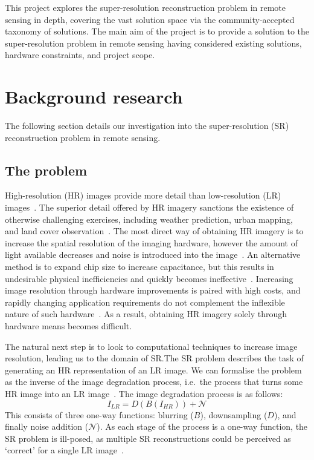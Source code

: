 This project explores the super-resolution reconstruction problem in remote sensing in depth, covering the vast solution space via the community-accepted taxonomy of solutions. The main aim of the project is to provide a solution to the super-resolution problem in remote sensing having considered existing solutions, hardware constraints, and project scope.

\section{Background research}\label{sec:background_research}
The following section details our investigation into the super-resolution (SR) reconstruction problem in remote sensing.

\subsection{The problem}\label{subsec:the_problem}
High-resolution (HR) images provide more detail than low-resolution (LR) images~\cite{urbanMapping}. The superior detail offered by HR imagery sanctions the existence of otherwise challenging exercises, including weather prediction, urban mapping, and land cover observation~\cite{urbanMapping, mapping, cloudCover, vegetationMapping}. The most direct way of obtaining HR imagery is to increase the spatial resolution of the imaging hardware, however the amount of light available decreases and noise is introduced into the image~\cite{superResOverview}. An alternative method is to expand chip size to increase capacitance, but this results in undesirable physical inefficiencies and quickly becomes ineffective~\cite{superResOverview}. Increasing image resolution through hardware improvements is paired with high costs, and rapidly changing application requirements do not complement the inflexible nature of such hardware~\cite{remoteSensingGANsReview}. As a result, obtaining HR imagery solely through hardware means becomes difficult.

The natural next step is to look to computational techniques to increase image resolution, leading us to the domain of SR.\@ The SR problem describes the task of generating an HR representation of an LR image. We can formalise the problem as the inverse of the image degradation process, i.e.\ the process that turns some HR image into an LR image~\cite{imageDeg}. The image degradation process is as follows:
\begin{equation}\label{eq:image_deg}
    I_{LR} = D(B(I_{HR})) + \mathcal{N}
\end{equation}
This consists of three one-way functions: blurring ($B$), downsampling ($D$), and finally noise addition ($\mathcal{N}$). As each stage of the process is a one-way function, the SR problem is ill-posed, as multiple SR reconstructions could be perceived as `correct' for a single LR image~\cite{remoteSensingDeepLearningReview}.

